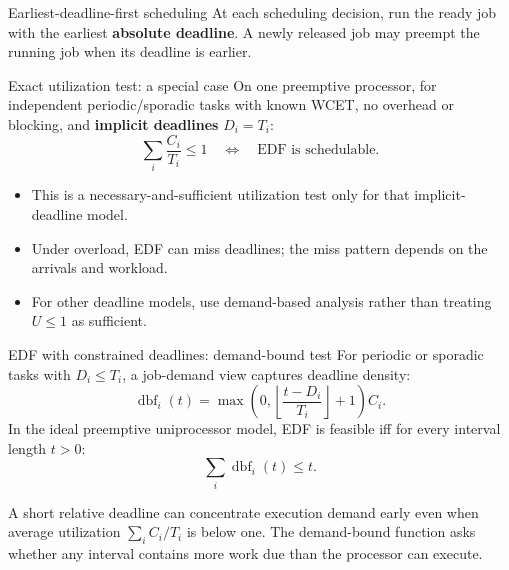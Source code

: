 \documentclass[aspectratio=169,11pt]{beamer}
\begin{document}
\begin{frame}{Earliest-deadline-first scheduling}
  \small
  At each scheduling decision, run the ready job with the earliest \textbf{absolute deadline}. A newly released job may preempt the running job when its deadline is earlier.
  \begin{block}{Exact utilization test: a special case}
    On one preemptive processor, for independent periodic/sporadic tasks with known WCET, no overhead or blocking, and \textbf{implicit deadlines} $D_i=T_i$:
    \[
      \sum_i\frac{C_i}{T_i}\leq1
      \quad\Longleftrightarrow\quad \text{EDF is schedulable.}
    \]
  \end{block}
  \begin{itemize}
    \item This is a necessary-and-sufficient utilization test only for that implicit-deadline model.
    \item Under overload, EDF can miss deadlines; the miss pattern depends on the arrivals and workload.
    \item For other deadline models, use demand-based analysis rather than treating $U\leq1$ as sufficient.
  \end{itemize}
\end{frame}

\begin{frame}{EDF with constrained deadlines: demand-bound test}
  \small
  For periodic or sporadic tasks with $D_i\leq T_i$, a job-demand view captures deadline density:
  \[
    \operatorname{dbf}_i(t)=
      \max\!\left(0,\left\lfloor\frac{t-D_i}{T_i}\right\rfloor+1\right)C_i.
  \]
  In the ideal preemptive uniprocessor model, EDF is feasible iff for every interval length $t>0$:
  \[
    \sum_i \operatorname{dbf}_i(t)\leq t.
  \]
  \begin{tcolorbox}[title=Why utilization alone can fail,colback=orange!5,colframe=orange!70]
    A short relative deadline can concentrate execution demand early even when average utilization $\sum_i C_i/T_i$ is below one. The demand-bound function asks whether any interval contains more work due than the processor can execute.
  \end{tcolorbox}
\end{frame}
\end{document}
